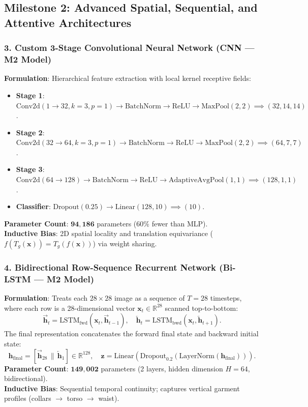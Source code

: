 \documentclass[11pt, a4paper]{article}
\begin{document}
\subsection{Milestone 2: Advanced Spatial, Sequential, and Attentive Architectures}

\subsubsection{3. Custom 3-Stage Convolutional Neural Network (CNN --- M2 Model)}
\textbf{Formulation}: Hierarchical feature extraction with local kernel receptive fields:
\begin{itemize}[noitemsep]
  \item \textbf{Stage 1}: $\text{Conv2d}(1 \to 32, k=3, p=1) \to \text{BatchNorm} \to \text{ReLU} \to \text{MaxPool}(2, 2) \implies (32, 14, 14)$.
  \item \textbf{Stage 2}: $\text{Conv2d}(32 \to 64, k=3, p=1) \to \text{BatchNorm} \to \text{ReLU} \to \text{MaxPool}(2, 2) \implies (64, 7, 7)$.
  \item \textbf{Stage 3}: $\text{Conv2d}(64 \to 128) \to \text{BatchNorm} \to \text{ReLU} \to \text{AdaptiveAvgPool}(1, 1) \implies (128, 1, 1)$.
  \item \textbf{Classifier}: $\text{Dropout}(0.25) \to \text{Linear}(128, 10) \implies (10)$.
\end{itemize}
\textbf{Parameter Count}: $\mathbf{94{,}186}$ parameters ($60\%$ fewer than MLP).\\
\textbf{Inductive Bias}: 2D spatial locality and translation equivariance ($f(T_g(\mathbf{x})) = T_g(f(\mathbf{x}))$) via weight sharing.

\subsubsection{4. Bidirectional Row-Sequence Recurrent Network (Bi-LSTM --- M2 Model)}
\textbf{Formulation}: Treats each $28 \times 28$ image as a sequence of $T=28$ timesteps, where each row is a 28-dimensional vector $\mathbf{x}_t \in \mathbb{R}^{28}$ scanned top-to-bottom:
\begin{equation}
  \overrightarrow{\mathbf{h}}_t = \text{LSTM}_{\text{fwd}}(\mathbf{x}_t, \overrightarrow{\mathbf{h}}_{t-1}), \quad
  \overleftarrow{\mathbf{h}}_t = \text{LSTM}_{\text{bwd}}(\mathbf{x}_t, \overleftarrow{\mathbf{h}}_{t+1}).
\end{equation}
The final representation concatenates the forward final state and backward initial state:
\begin{equation}
  \mathbf{h}_{\text{final}} = [\overrightarrow{\mathbf{h}}_{28} \,\|\, \overleftarrow{\mathbf{h}}_1] \in \mathbb{R}^{128}, \quad
  \mathbf{z} = \text{Linear}(\text{Dropout}_{0.2}(\text{LayerNorm}(\mathbf{h}_{\text{final}}))).
\end{equation}
\textbf{Parameter Count}: $\mathbf{149{,}002}$ parameters (2 layers, hidden dimension $H=64$, bidirectional).\\
\textbf{Inductive Bias}: Sequential temporal continuity; captures vertical garment profiles (collars $\to$ torso $\to$ waist).
\end{document}
